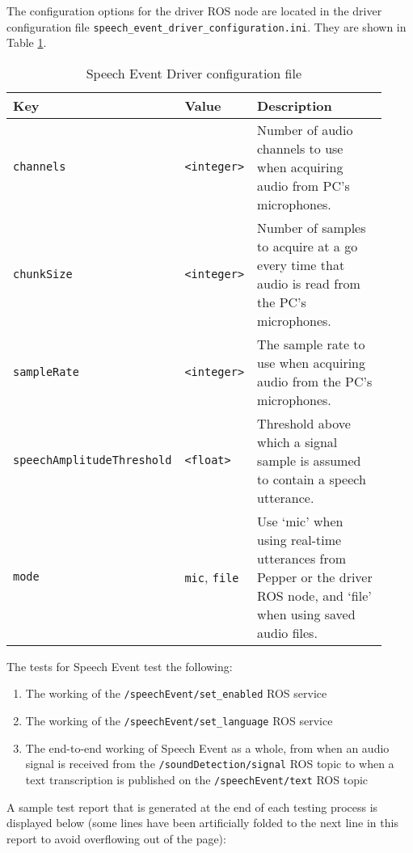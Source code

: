 \documentclass{CSSRforAfrica}
\begin{document}
The configuration options for the driver ROS node are located in the driver configuration file \texttt{speech\_event\_driver\_configuration.ini}. They are shown in Table \ref{table:driver-configuration}.

\begin{center}
\begin{table}[thb]
\begin{tabular}[thb]{|p{0.35\linewidth}|p{0.13\linewidth}|p{0.44\linewidth}|} \hline
\rowcolor{lightgray} Key & Value & Description \\ \hline
\texttt{channels} & \texttt{<integer>} & Number of audio channels to use when acquiring audio from PC's microphones. \\ \hline
\texttt{chunkSize} & \texttt{<integer>} & Number of samples to acquire at a go every time that audio is read from the PC's microphones. \\ \hline
\texttt{sampleRate} & \texttt{<integer>} & The sample rate to use when acquiring audio from the PC's microphones. \\ \hline
\texttt{speechAmplitudeThreshold} & \texttt{<float>} & Threshold above which a signal sample is assumed to contain a speech utterance. \\ \hline
\texttt{mode} & \texttt{mic}, \texttt{file} & Use `mic' when using real-time utterances from Pepper or the driver ROS node, and `file' when using saved audio files. \\ \hline
\end{tabular}
\caption{Speech Event Driver configuration file}
\label{table:driver-configuration}
\end{table}
\end{center}

The tests for Speech Event test the following:

\begin{enumerate}
    \item The working of the \texttt{/speechEvent/set\_enabled} ROS service
    \item The working of the \texttt{/speechEvent/set\_language} ROS service
    \item The end-to-end working of Speech Event as a whole, from when an audio signal is received from the \texttt{/soundDetection/signal} ROS topic to when a text transcription is published on the \texttt{/speechEvent/text} ROS topic
\end{enumerate}

A sample test report that is generated at the end of each testing process is displayed below (some lines have been artificially folded to the next line in this report to avoid overflowing out of the page):
\end{document}
